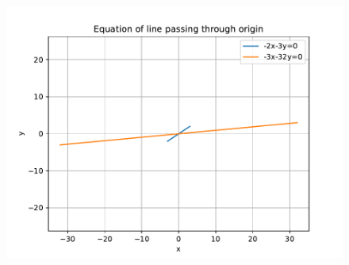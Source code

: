 \documentclass[12pt]{article}
\begin{document}
\begin{enumerate}
\begin{enumerate}
\begin{figure}[!h]
\begin{center}
\includegraphics[width=\columnwidth]{figs/fig3.pdf}
\end{center}
\caption{}
\label{fig:Fig3}
\end{figure}
\end{enumerate}
\end{enumerate}
\end{document}
